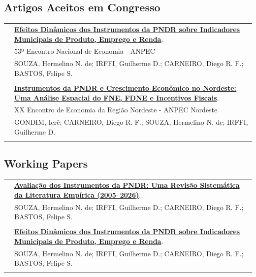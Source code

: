 \documentclass[a4paper,12pt]{article}
\begin{document}
	\subsection*{Artigos Aceitos em Congresso}
	\setlength{\LTleft}{0pt}
	\begin{longtable}[t]{>{\raggedleft\arraybackslash}p{2.0cm}>{\raggedright\arraybackslash}p{13.5cm}}
		2025 & \href{https://www.anpec.org.br/encontro/2025/submissao/files_I/i10-122223bba2914979f052512e41d1e1f7.pdf}{\textbf{Efeitos Dinâmicos dos Instrumentos da PNDR sobre Indicadores Municipais de Produto, Emprego e Renda}}. \\
		& 53º Encontro Nacional de Economia - ANPEC \\
		& SOUZA, Hermelino N. de; IRFFI, Guilherme D.; CARNEIRO, Diego R. F.; BASTOS, Felipe S. \\

		\multicolumn{2}{c}{\vspace{-0.2cm}} \\

		2025 & \href{https://www.anpec.org.br/nordeste/2025/submissao/arquivos_identificados/045-821b2d69029114749e9f3597ac6a9952.pdf}{\textbf{Instrumentos da PNDR e Crescimento Econômico no Nordeste: Uma Análise Espacial do FNE, FDNE e Incentivos Fiscais}}. \\
		& XX Encontro de Economia da Região Nordeste - ANPEC Nordeste \\
		& GONDIM, Ierê; CARNEIRO, Diego R. F.; SOUZA, Hermelino N. de; IRFFI, Guilherme D. \\
		
		\multicolumn{2}{c}{\vspace{-0.2cm}} \\
	\end{longtable}

	\subsection*{Working Papers}
	\setlength{\LTleft}{0pt}
	\begin{longtable}[t]{>{\raggedleft\arraybackslash}p{2.0cm}>{\raggedright\arraybackslash}p{13.5cm}}
		2026 & \href{https://raw.githubusercontent.com/hermelino/pndr_survey/main/latex/0-main.pdf}{\textbf{Avaliação dos Instrumentos da PNDR: Uma Revisão Sistemática da Literatura Empírica (2005--2026)}}. \\
		& SOUZA, Hermelino N. de; IRFFI, Guilherme D.; CARNEIRO, Diego R. F.; BASTOS, Felipe S. \\
		\multicolumn{2}{c}{\vspace{-0.2cm}} \\

		2025 & \href{https://www.anpec.org.br/encontro/2025/submissao/files_I/i10-122223bba2914979f052512e41d1e1f7.pdf}{\textbf{Efeitos Dinâmicos dos Instrumentos da PNDR sobre Indicadores Municipais de Produto, Emprego e Renda}}. \\
		& SOUZA, Hermelino N. de; IRFFI, Guilherme D.; CARNEIRO, Diego R. F.; BASTOS, Felipe S. \\
		\multicolumn{2}{c}{\vspace{-0.2cm}} \\
	\end{longtable}
\end{document}
